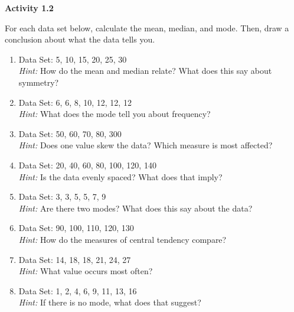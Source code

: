 \vspace{1ex}
\noindent\textbf{Activity 1.2}

\vspace{0.75ex}

For each data set below, calculate the mean, median, and mode. Then, draw a conclusion about what the data tells you.

\begin{enumerate} 
\item Data Set: 5, 10, 15, 20, 25, 30 \\ 
\textit{Hint:} How do the mean and median relate? What does this say about symmetry?

\item Data Set: 6, 6, 8, 10, 12, 12, 12 \\
 \textit{Hint:} What does the mode tell you about frequency?

\item Data Set: 50, 60, 70, 80, 300 \\
 \textit{Hint:} Does one value skew the data? Which measure is most affected?

\item Data Set: 20, 40, 60, 80, 100, 120, 140 \\ 
\textit{Hint:} Is the data evenly spaced? What does that imply?

\item Data Set: 3, 3, 5, 5, 7, 9 \\
 \textit{Hint:} Are there two modes? What does this say about the data?

\item Data Set: 90, 100, 110, 120, 130 \\
 \textit{Hint:} How do the measures of central tendency compare?

\item Data Set: 14, 18, 18, 21, 24, 27 \\ 
\textit{Hint:} What value occurs most often?

\item Data Set: 1, 2, 4, 6, 9, 11, 13, 16 \\ 
\textit{Hint:} If there is no mode, what does that suggest?


 \end{enumerate}



